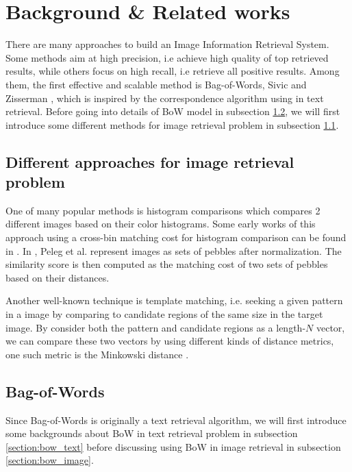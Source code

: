 % 

\section{Background \& Related works} \label{section:background_relatedworks}
There are many approaches to build an Image Information Retrieval System. Some methods aim at high precision, i.e achieve high quality of top retrieved results, while others focus on high recall, i.e retrieve all positive results. Among them, the first effective and scalable method is Bag-of-Words, Sivic and Zisserman \cite{3}, which is inspired by the correspondence algorithm using in text retrieval. Before going into details of BoW model in subsection \ref{section:background_bow}, we will first introduce some different methods for image retrieval problem in subsection \ref{section:background_dif_method}.

\subsection{Different approaches for image retrieval problem} \label{section:background_dif_method}
One of many popular methods is histogram comparisons which compares 2 different images based on their color histograms. Some early works of this approach using a cross-bin matching cost for histogram comparison can be found in \cite{Shen1983187, Werman1985328, Peleg192468}. In \cite{Peleg192468}, Peleg et al. represent images as sets of pebbles after normalization. The similarity score is then computed as the matching cost of two sets of pebbles based on their distances.

Another well-known technique is template matching, i.e. seeking a given pattern in a image by comparing to candidate regions of the same size in the target image. By consider both the pattern and candidate regions as a length-$N$ vector, we can compare these two vectors by using different kinds of distance metrics, one such metric is the Minkowski distance \cite{Ouyang5770267}.

\subsection{Bag-of-Words}\label{section:background_bow}

Since Bag-of-Words is originally a text retrieval algorithm, we will first introduce some backgrounds about BoW in text retrieval problem in subsection \ref{section:bow_text} before discussing using BoW in image retrieval in subsection \ref{section:bow_image}.

